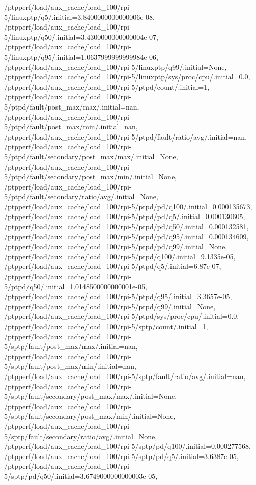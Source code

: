 {    /ptpperf/load/aux_cache/load_100/rpi-5/linuxptp/q5/.initial=3.8400000000000006e-08,
    /ptpperf/load/aux_cache/load_100/rpi-5/linuxptp/q50/.initial=3.4300000000000004e-07,
    /ptpperf/load/aux_cache/load_100/rpi-5/linuxptp/q95/.initial=1.0637999999999984e-06,
    /ptpperf/load/aux_cache/load_100/rpi-5/linuxptp/q99/.initial=None,
    /ptpperf/load/aux_cache/load_100/rpi-5/linuxptp/sys/proc/cpu/.initial=0.0,
    /ptpperf/load/aux_cache/load_100/rpi-5/ptpd/count/.initial=1,
    /ptpperf/load/aux_cache/load_100/rpi-5/ptpd/fault/post_max/max/.initial=nan,
    /ptpperf/load/aux_cache/load_100/rpi-5/ptpd/fault/post_max/min/.initial=nan,
    /ptpperf/load/aux_cache/load_100/rpi-5/ptpd/fault/ratio/avg/.initial=nan,
    /ptpperf/load/aux_cache/load_100/rpi-5/ptpd/fault/secondary/post_max/max/.initial=None,
    /ptpperf/load/aux_cache/load_100/rpi-5/ptpd/fault/secondary/post_max/min/.initial=None,
    /ptpperf/load/aux_cache/load_100/rpi-5/ptpd/fault/secondary/ratio/avg/.initial=None,
    /ptpperf/load/aux_cache/load_100/rpi-5/ptpd/pd/q100/.initial=0.000135673,
    /ptpperf/load/aux_cache/load_100/rpi-5/ptpd/pd/q5/.initial=0.000130605,
    /ptpperf/load/aux_cache/load_100/rpi-5/ptpd/pd/q50/.initial=0.000132581,
    /ptpperf/load/aux_cache/load_100/rpi-5/ptpd/pd/q95/.initial=0.000134609,
    /ptpperf/load/aux_cache/load_100/rpi-5/ptpd/pd/q99/.initial=None,
    /ptpperf/load/aux_cache/load_100/rpi-5/ptpd/q100/.initial=9.1335e-05,
    /ptpperf/load/aux_cache/load_100/rpi-5/ptpd/q5/.initial=6.87e-07,
    /ptpperf/load/aux_cache/load_100/rpi-5/ptpd/q50/.initial=1.0148500000000001e-05,
    /ptpperf/load/aux_cache/load_100/rpi-5/ptpd/q95/.initial=3.3657e-05,
    /ptpperf/load/aux_cache/load_100/rpi-5/ptpd/q99/.initial=None,
    /ptpperf/load/aux_cache/load_100/rpi-5/ptpd/sys/proc/cpu/.initial=0.0,
    /ptpperf/load/aux_cache/load_100/rpi-5/sptp/count/.initial=1,
    /ptpperf/load/aux_cache/load_100/rpi-5/sptp/fault/post_max/max/.initial=nan,
    /ptpperf/load/aux_cache/load_100/rpi-5/sptp/fault/post_max/min/.initial=nan,
    /ptpperf/load/aux_cache/load_100/rpi-5/sptp/fault/ratio/avg/.initial=nan,
    /ptpperf/load/aux_cache/load_100/rpi-5/sptp/fault/secondary/post_max/max/.initial=None,
    /ptpperf/load/aux_cache/load_100/rpi-5/sptp/fault/secondary/post_max/min/.initial=None,
    /ptpperf/load/aux_cache/load_100/rpi-5/sptp/fault/secondary/ratio/avg/.initial=None,
    /ptpperf/load/aux_cache/load_100/rpi-5/sptp/pd/q100/.initial=0.000277568,
    /ptpperf/load/aux_cache/load_100/rpi-5/sptp/pd/q5/.initial=3.6387e-05,
    /ptpperf/load/aux_cache/load_100/rpi-5/sptp/pd/q50/.initial=3.6749000000000003e-05,
}
